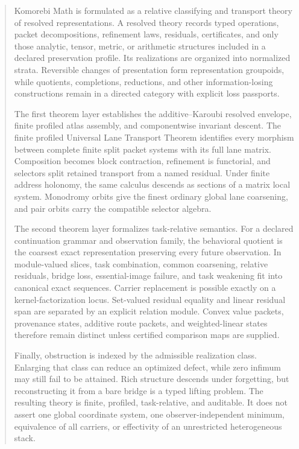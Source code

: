 \documentclass[11pt]{article}
\theoremstyle{definition}
\theoremstyle{remark}
\begin{document}
\thispagestyle{plain}
\begin{abstract}
Komorebi Math is formulated as a relative classifying and transport theory of resolved representations. A resolved theory records typed operations, packet decompositions, refinement laws, residuals, certificates, and only those analytic, tensor, metric, or arithmetic structures included in a declared preservation profile. Its realizations are organized into normalized strata. Reversible changes of presentation form representation groupoids, while quotients, completions, reductions, and other information-losing constructions remain in a directed category with explicit loss passports.

The first theorem layer establishes the additive--Karoubi resolved envelope, finite profiled atlas assembly, and componentwise invariant descent. The finite profiled Universal Lane Transport Theorem identifies every morphism between complete finite split packet systems with its full lane matrix. Composition becomes block contraction, refinement is functorial, and selectors split retained transport from a named residual. Under finite address holonomy, the same calculus descends as sections of a matrix local system. Monodromy orbits give the finest ordinary global lane coarsening, and pair orbits carry the compatible selector algebra.

The second theorem layer formalizes task-relative semantics. For a declared continuation grammar and observation family, the behavioral quotient is the coarsest exact representation preserving every future observation. In module-valued slices, task combination, common coarsening, relative residuals, bridge loss, essential-image failure, and task weakening fit into canonical exact sequences. Carrier replacement is possible exactly on a kernel-factorization locus. Set-valued residual equality and linear residual span are separated by an explicit relation module. Convex value packets, provenance states, additive route packets, and weighted-linear states therefore remain distinct unless certified comparison maps are supplied.

Finally, obstruction is indexed by the admissible realization class. Enlarging that class can reduce an optimized defect, while zero infimum may still fail to be attained. Rich structure descends under forgetting, but reconstructing it from a bare bridge is a typed lifting problem. The resulting theory is finite, profiled, task-relative, and auditable. It does not assert one global coordinate system, one observer-independent minimum, equivalence of all carriers, or effectivity of an unrestricted heterogeneous stack.
\end{abstract}
\end{document}
